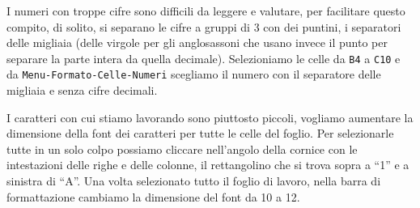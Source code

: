
\vspace{.5em}
\salvare

I numeri con troppe cifre sono difficili da leggere e valutare,
per facilitare questo compito, di solito, si separano le cifre a gruppi di 3
con dei puntini, i separatori delle migliaia
(delle virgole per gli anglosassoni che
usano invece il punto per separare la parte intera da quella decimale).
Selezioniamo le celle da \texttt{B4} a \texttt{C10} e da 
\texttt{Menu-Formato-Celle-Numeri}
scegliamo il numero con il separatore delle migliaia e senza cifre decimali.

I caratteri con cui stiamo lavorando sono piuttosto piccoli, vogliamo
aumentare la dimensione della font dei caratteri per tutte le celle del
foglio. Per selezionarle tutte in un solo colpo possiamo cliccare
nell'angolo della cornice con le intestazioni delle righe e delle colonne,
il rettangolino che si trova sopra a ``1'' e a sinistra di ``A''. Una volta
selezionato tutto il foglio di lavoro, nella barra di formattazione cambiamo
la dimensione del font da 10 a 12.

